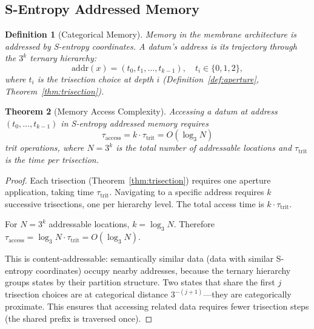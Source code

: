 \documentclass[twocolumn,10pt]{article}
\newtheorem{theorem}{Theorem}[section]
\newtheorem{definition}[theorem]{Definition}
\theoremstyle{remark}
\begin{document}
\subsection{S-Entropy Addressed Memory}

\begin{definition}[Categorical Memory]
\label{def:memory}
Memory in the membrane architecture is addressed by S-entropy coordinates. A datum's address is its trajectory through the $3^k$ ternary hierarchy:
\begin{equation}
\mathrm{addr}(x) = (t_0, t_1, \ldots, t_{k-1}), \quad t_i \in \{0, 1, 2\},
\label{eq:address}
\end{equation}
where $t_i$ is the trisection choice at depth $i$ (Definition~\ref{def:aperture}, Theorem~\ref{thm:trisection}).
\end{definition}

\begin{theorem}[Memory Access Complexity]
\label{thm:memory_access}
Accessing a datum at address $(t_0, \ldots, t_{k-1})$ in S-entropy addressed memory requires
\begin{equation}
\tau_{\mathrm{access}} = k \cdot \tau_{\mathrm{trit}} = O(\log_3 N)
\label{eq:access_time}
\end{equation}
trit operations, where $N = 3^k$ is the total number of addressable locations and $\tau_{\mathrm{trit}}$ is the time per trisection.
\end{theorem}

\begin{proof}
Each trisection (Theorem~\ref{thm:trisection}) requires one aperture application, taking time $\tau_{\mathrm{trit}}$. Navigating to a specific address requires $k$ successive trisections, one per hierarchy level. The total access time is $k \cdot \tau_{\mathrm{trit}}$.

For $N = 3^k$ addressable locations, $k = \log_3 N$. Therefore $\tau_{\mathrm{access}} = \log_3 N \cdot \tau_{\mathrm{trit}} = O(\log_3 N)$.

This is content-addressable: semantically similar data (data with similar S-entropy coordinates) occupy nearby addresses, because the ternary hierarchy groups states by their partition structure. Two states that share the first $j$ trisection choices are at categorical distance $3^{-(j+1)}$---they are categorically proximate. This ensures that accessing related data requires fewer trisection steps (the shared prefix is traversed once).
\end{proof}
\end{document}
